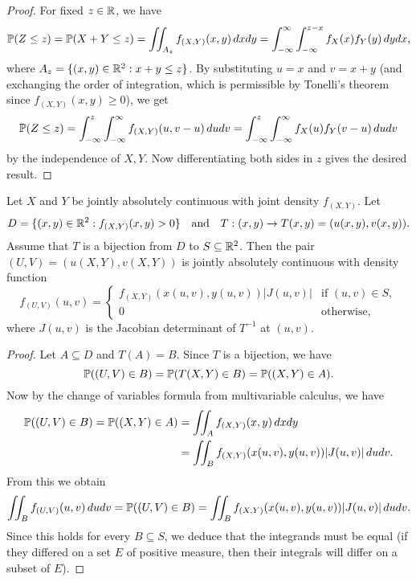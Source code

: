 \begin{proof}
  For fixed $z \in \mathbb{R}$, we have
  \[
    \mathbb{P}(Z \le z) = \mathbb{P}(X + Y \le z)
    = \iint_{A_z} f_{(X, Y)}(x, y) \, dx dy
    = \int_{-\infty}^\infty \int_{-\infty}^{z - x} f_X(x) f_Y(y) \, dy dx,
  \]
  where $A_z = \{(x, y) \in \mathbb{R}^2 : x + y \le z\}$.
  By substituting $u = x$ and $v = x + y$ (and
  exchanging the order of integration, which is
  permissible by Tonelli's theorem since $f_{(X, Y)}(x, y) \ge 0$), we get
  \[
    \mathbb{P}(Z \le z)
    = \int_{-\infty}^z \int_{-\infty}^\infty f_{(X, Y)}(u, v - u) \, du dv
    = \int_{-\infty}^z \int_{-\infty}^\infty f_X(u) f_Y(v - u) \, du dv
  \]
  by the independence of $X, Y$. Now differentiating
  both sides in $z$ gives the desired result.
\end{proof}

\begin{theorem}
  Let $X$ and $Y$ be jointly absolutely continuous
  with joint density $f_{(X, Y)}$. Let
  \[
    D = \{(x, y) \in \mathbb{R}^2 : f_{(X, Y)}(x, y) > 0\}
    \quad \text{and} \quad
    T : (x, y) \to T(x, y) = (u(x, y), v(x, y)).
  \]
  Assume that $T$ is a bijection from
  $D$ to $S \subseteq \mathbb{R}^2$. Then the pair
  $(U, V) = (u(X, Y), v(X, Y))$ is jointly absolutely
  continuous with density function
  \[
    f_{(U, V)}(u, v) =
    \begin{cases}
      f_{(X, Y)}(x(u, v), y(u, v)) |J(u, v)| & \text{if $(u, v) \in S$}, \\
      0 & \text{otherwise},
    \end{cases}
  \]
  where $J(u, v)$ is the Jacobian determinant
  of $T^{-1}$ at $(u, v)$.
\end{theorem}

\begin{proof}
  Let $A \subseteq D$ and $T(A) = B$. Since
  $T$ is a bijection, we have
  \[
    \mathbb{P}((U, V) \in B)
    = \mathbb{P}(T(X, Y) \in B)
    = \mathbb{P}((X, Y) \in A).
  \]
  Now by the change of variables formula from
  multivariable calculus, we have
  \begin{align*}
    \mathbb{P}((U, V) \in B)
    = \mathbb{P}((X, Y) \in A)
    &= \iint_A f_{(X, Y)}(x, y) \, dx dy \\
    &= \iint_B f_{(X, Y)}(x(u, v), y(u, v)) |J(u, v)| \, du dv.
  \end{align*}
  From this we obtain
  \[
    \iint_B f_{(U, V)}(u, v) \, du dv
    = \mathbb{P}((U, V) \in B)
    = \iint_B f_{(X, Y)}(x(u, v), y(u, v)) |J(u, v)| \, du dv.
  \]
  Since this holds for every $B \subseteq S$, we
  deduce that the integrands must be equal (if they
  differed on a set $E$ of positive measure, then their
  integrals will differ on a subset of $E$).
\end{proof}

